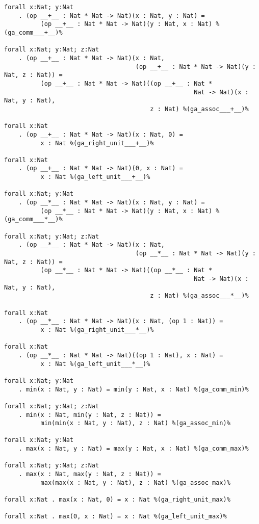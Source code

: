 \documentclass[11pt,a4paper]{article}
\begin{document}
\begin{verbatim}
forall x:Nat; y:Nat
    . (op __+__ : Nat * Nat -> Nat)(x : Nat, y : Nat) =
          (op __+__ : Nat * Nat -> Nat)(y : Nat, x : Nat) %(ga_comm___+__)%

forall x:Nat; y:Nat; z:Nat
    . (op __+__ : Nat * Nat -> Nat)(x : Nat,
                                    (op __+__ : Nat * Nat -> Nat)(y : Nat, z : Nat)) =
          (op __+__ : Nat * Nat -> Nat)((op __+__ : Nat *
                                                    Nat -> Nat)(x : Nat, y : Nat),
                                        z : Nat) %(ga_assoc___+__)%

forall x:Nat
    . (op __+__ : Nat * Nat -> Nat)(x : Nat, 0) =
          x : Nat %(ga_right_unit___+__)%

forall x:Nat
    . (op __+__ : Nat * Nat -> Nat)(0, x : Nat) =
          x : Nat %(ga_left_unit___+__)%

forall x:Nat; y:Nat
    . (op __*__ : Nat * Nat -> Nat)(x : Nat, y : Nat) =
          (op __*__ : Nat * Nat -> Nat)(y : Nat, x : Nat) %(ga_comm___*__)%

forall x:Nat; y:Nat; z:Nat
    . (op __*__ : Nat * Nat -> Nat)(x : Nat,
                                    (op __*__ : Nat * Nat -> Nat)(y : Nat, z : Nat)) =
          (op __*__ : Nat * Nat -> Nat)((op __*__ : Nat *
                                                    Nat -> Nat)(x : Nat, y : Nat),
                                        z : Nat) %(ga_assoc___*__)%

forall x:Nat
    . (op __*__ : Nat * Nat -> Nat)(x : Nat, (op 1 : Nat)) =
          x : Nat %(ga_right_unit___*__)%

forall x:Nat
    . (op __*__ : Nat * Nat -> Nat)((op 1 : Nat), x : Nat) =
          x : Nat %(ga_left_unit___*__)%

forall x:Nat; y:Nat
    . min(x : Nat, y : Nat) = min(y : Nat, x : Nat) %(ga_comm_min)%

forall x:Nat; y:Nat; z:Nat
    . min(x : Nat, min(y : Nat, z : Nat)) =
          min(min(x : Nat, y : Nat), z : Nat) %(ga_assoc_min)%

forall x:Nat; y:Nat
    . max(x : Nat, y : Nat) = max(y : Nat, x : Nat) %(ga_comm_max)%

forall x:Nat; y:Nat; z:Nat
    . max(x : Nat, max(y : Nat, z : Nat)) =
          max(max(x : Nat, y : Nat), z : Nat) %(ga_assoc_max)%

forall x:Nat . max(x : Nat, 0) = x : Nat %(ga_right_unit_max)%

forall x:Nat . max(0, x : Nat) = x : Nat %(ga_left_unit_max)%


\end{verbatim}
\end{document}
